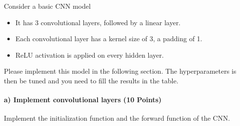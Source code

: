 \documentclass[11pt]{article}
\providecommand{\tightlist}{%
      \setlength{\itemsep}{0pt}\setlength{\parskip}{0pt}}
\begin{document}
    Consider a basic CNN model

\begin{itemize}
\tightlist
\item
  It has 3 convolutional layers, followed by a linear layer.
\item
  Each convolutional layer has a kernel size of 3, a padding of 1.
\item
  ReLU activation is applied on every hidden layer.
\end{itemize}

Please implement this model in the following section. The
hyperparameters is then be tuned and you need to fill the results in the
table.

    \hypertarget{a-implement-convolutional-layers-10-points}{%
\paragraph{a) Implement convolutional layers (10
Points)}\label{a-implement-convolutional-layers-10-points}}

    Implement the initialization function and the forward function of the
CNN.
\end{document}

